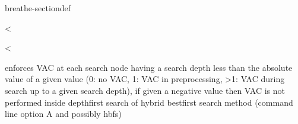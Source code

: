 \documentclass[letterpaper,10pt,openany,oneside,english]{sphinxmanual}
\begin{document}
\begin{fulllineitems}
\begin{sphinxuseclass}{breathe-sectiondef}
\begin{fulllineitems}
\end{fulllineitems}


\begin{fulllineitems}
\label{\detokenize{ref/ref_cpp:_CPPv4N8ToulBar23vacE}}\label{\detokenize{ref/ref_cpp:_CPPv3N8ToulBar23vacE}}\label{\detokenize{ref/ref_cpp:_CPPv2N8ToulBar23vacE}}\label{\detokenize{ref/ref_cpp:ToulBar2::vac__i}}
\pysigstartsignatures
\pysigstartmultiline
{}
\pysigstopmultiline
\pysigstopsignatures
\sphinxAtStartPar
\textless{} 

\end{fulllineitems}


\begin{fulllineitems}
\label{\detokenize{ref/ref_cpp:_CPPv4N8ToulBar214costThresholdSE}}\label{\detokenize{ref/ref_cpp:_CPPv3N8ToulBar214costThresholdSE}}\label{\detokenize{ref/ref_cpp:_CPPv2N8ToulBar214costThresholdSE}}\label{\detokenize{ref/ref_cpp:ToulBar2::costThresholdS__string}}
\pysigstartsignatures
\pysigstartmultiline
{}
\pysigstopmultiline
\pysigstopsignatures
\sphinxAtStartPar
\textless{} 

\sphinxAtStartPar
enforces VAC at each search node having a search depth less than the absolute value of a given value (0: no VAC, 1: VAC in preprocessing, \textgreater{}1: VAC during search up to a given search depth), if given a negative value then VAC is not performed inside depth\sphinxhyphen{}first search of hybrid best\sphinxhyphen{}first search method (command line option \sphinxhyphen{}A and possibly \sphinxhyphen{}hbfs) 

\end{fulllineitems}



\end{sphinxuseclass}
\end{fulllineitems}
\end{document}
